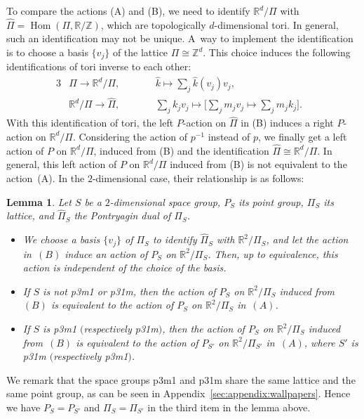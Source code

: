 \documentclass[pdftex]{sigma}
\newtheorem{lem}[thm]{Lemma}
\theoremstyle{definition}
\newcommand{\R}{\mathbb{R}}
\newcommand{\Z}{\mathbb{Z}}
\begin{document}
To compare the actions (A) and (B), we need to identify $\R^d/\Pi$ with $\hat{\Pi} = \operatorname{Hom}(\Pi, \R/\Z)$, which are topologically $d$-dimensional tori. In general, such an identif\/ication may not be unique. A~way to implement the identif\/ication is to choose a basis $\{ v_j \}$ of the lattice $\Pi \cong \Z^d$. This choice induces the following identif\/ications of tori inverse to each other:
\begin{alignat*}{3}
& \hat{\Pi} \longrightarrow \R^d/\Pi, \qquad && \hat{k} \mapsto \sum_j \hat{k}(v_j) v_j,& \\
& \R^d/\Pi \longrightarrow \hat{\Pi}, \qquad && \sum_j k_j v_j \mapsto \bigg[\sum_j m_j v_j \mapsto \sum_j m_jk_j\bigg].&
\end{alignat*}
With this identif\/ication of tori, the left $P$-action on $\hat{\Pi}$ in (B) induces a right $P$-action on $\R^d/\Pi$. Considering the action of $p^{-1}$ instead of $p$, we f\/inally get a left action of $P$ on $\R^d/\Pi$, induced from (B) and the identif\/ication $\hat{\Pi} \cong \R^d/\Pi$. In general, this left action of $P$ on $\R^d/\Pi$ induced from (B) is not equivalent to the action~(A). In the $2$-dimensional case, their relationship is as follows:

\begin{lem}
Let $S$ be a $2$-dimensional space group, $P_S$ its point group, $\Pi_S$ its lattice, and $\hat{\Pi}_S$ the Pontryagin dual of $\Pi_S$.
\begin{itemize}\itemsep=0pt
\item[$(a)$]
We choose a basis $\{ v_j \}$ of $\Pi_S$ to identify $\hat{\Pi}_S$ with $\R^2/\Pi_S$, and let the action in~$(B)$ induce an action of $P_S$ on $\R^2/\Pi_S$. Then, up to equivalence, this action is independent of the choice of the basis.

\item[(b)]
If $S$ is not \textsf{p3m1} or \textsf{p31m}, then the action of $P_S$ on $\R^2/\Pi_S$ induced from~$(B)$ is equivalent to the action of $P_S$ on $\R^2/\Pi_S$ in~$(A)$.

\item[(c)]
If $S$ is \textsf{p3m1} $($respectively \textsf{p31m}$)$, then the action of $P_S$ on $\R^2/\Pi_S$ induced from~$(B)$ is equivalent to the action of $P_{S'}$ on $\R^2/\Pi_{S'}$ in~$(A)$, where $S'$ is \textsf{p31m} $($respectively \textsf{p3m1}$)$.
\end{itemize}
\end{lem}

We remark that the space groups \textsf{p3m1} and \textsf{p31m} share the same lattice and the same point group, as can be seen in Appendix~\ref{sec:appendix:wallpapers}. Hence we have $P_S = P_{S'}$ and $\Pi_S = \Pi_{S'}$ in the third item in the lemma above.
\end{document}
